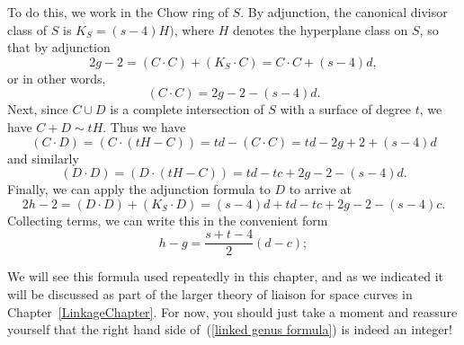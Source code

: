 To do this, we work in the Chow ring of $S$. By adjunction, the canonical divisor class of $S$ is $K_S = (s - 4)H)$, where $H$ denotes the hyperplane class on $S$, so that by adjunction 
$$
2g-2 = (C\cdot C) + (K_S\cdot C) = C\cdot C + (s-4)d, 
$$
or in other words,
$$
(C \cdot C) = 2g-2 - (s-4)d.
$$
Next, since $C \cup D$ is a complete intersection of $S$ with a surface of degree $t$, we have $C + D\sim tH$. Thus we have
$$
(C \cdot D) = (C \cdot (tH - C)) = td - (C \cdot C) = td - 2g + 2 + (s-4)d
$$
and similarly
$$
(D \cdot D) = (D \cdot (tH - C)) = td - tc + 2g - 2 - (s-4)d.
$$
Finally, we can apply the adjunction formula to $D$ to arrive at
$$
2h - 2 = (D \cdot D) + (K_S \cdot D) = (s-4)d  + td - tc + 2g - 2 - (s-4)c.
$$
Collecting terms, we can write this in the convenient form
\begin{equation}\label{linked genus formula}
h - g = \frac{s+t-4}{2}(d-c);
\end{equation}
 

We will see this formula used repeatedly in this chapter, and as we indicated it will be discussed as part of the larger theory of liaison for space curves in Chapter~\ref{LinkageChapter}. For now, you should just take a moment and reassure yourself that the right hand side of~(\ref{linked genus formula}) is indeed an integer!

%
%
%
%
%
%

